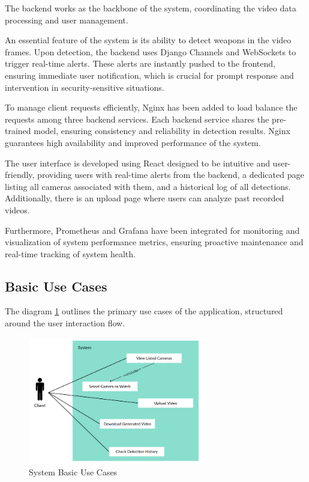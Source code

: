The backend works as the backbone of the system, coordinating the 
video data processing and user management.

An essential feature of the system is its ability to detect weapons in the video frames. Upon detection, the backend 
uses Django Channels and WebSockets to trigger real-time alerts. These alerts are instantly pushed to the frontend, 
ensuring immediate user notification, which is crucial for prompt response and intervention in 
security-sensitive situations.

To manage client requests efficiently, Nginx has been added to load balance the requests among three backend services. 
Each backend service shares the pre-trained model, ensuring consistency and reliability in detection results. 
Nginx guarantees high availability and improved performance of the system.

The user interface is developed using React designed to be intuitive and user-friendly, providing users with 
real-time alerts from the backend, a dedicated page listing all cameras associated with them, and a historical log 
of all detections. Additionally, there is an upload page where users can analyze past recorded videos.

Furthermore, Prometheus and Grafana have been integrated for monitoring and visualization of system performance metrics, 
ensuring proactive maintenance and real-time tracking of system health.

\subsection{Basic Use Cases}
The diagram \ref{fig:use-cases} outlines the primary use cases of the application, structured around the user 
interaction flow.
\begin{figure}[h]
    \centering 
    \includegraphics[width=0.7\textwidth]{figs/use-cases2.png} 
    \caption{System Basic Use Cases}
    \label{fig:use-cases}
\end{figure}

